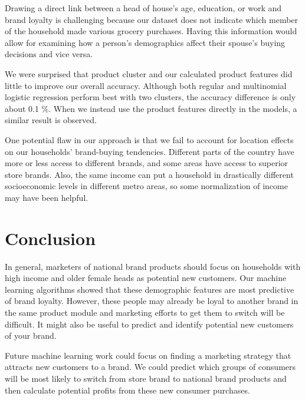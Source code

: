 \documentclass[conference]{IEEEtran}
\begin{document}
Drawing a direct link between a head of house's age, education, or work and brand loyalty is challenging because our dataset does not indicate which member of the household made various grocery purchases. Having this information would allow for examining how a person's demographics affect their spouse's buying decisions and vice versa.


We were surprised that product cluster and our calculated product features did little to improve our overall accuracy. Although both regular and multinomial logistic regression perform best with two clusters, the accuracy difference is only about 0.1 \%. When we instead use the product features directly in the models, a similar result is observed.


One potential flaw in our approach is that we fail to account for location effects on our households' brand-buying tendencies. Different parts of the country have more or less access to different brands, and some areas have access to superior store brands\cite{bronnenberg2016formation}. Also, the same income can put a household in drastically different socioeconomic levels in different metro areas, so some normalization of income may have been helpful. 


\section{Conclusion}
In general, marketers of national brand products should focus on households with high income and older female heads as potential new customers. Our machine learning algorithms showed that these demographic features are most predictive of brand loyalty. However, these people may already be loyal to another brand in the same product module and marketing efforts to get them to switch will be difficult. It might also be useful to predict and identify potential new customers of your brand.


Future machine learning work could focus on finding a marketing strategy that attracts new customers to a brand. We could predict which groups of consumers will be most likely to switch from store brand to national brand products and then calculate potential profits from these new consumer purchases. 






\end{document}
